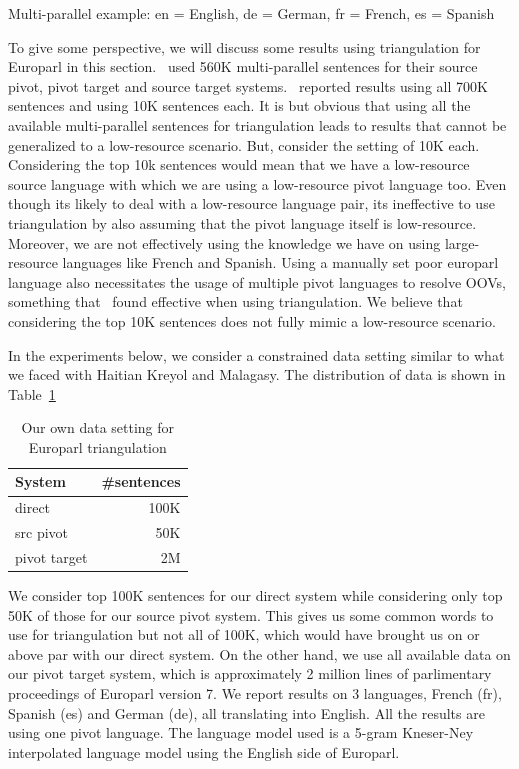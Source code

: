 \begin{table}
	\small
	\centering
	\small
	
	\caption{Multi-parallel example: en = English, de = German, fr = French, es = Spanish}
	\label{table:mparallel}
\end{table}

To give some perspective, we will discuss some results using triangulation for Europarl in this section.~\cite{Utiyama:07} used 560K multi-parallel sentences for their source pivot, pivot target and source target systems.~\cite{Cohn:07} reported results using all 700K sentences and using 10K sentences each. It is but obvious that using all the available multi-parallel sentences for triangulation leads to results that cannot be generalized to a low-resource scenario. But, consider the setting of 10K each. Considering the top 10k sentences would mean that we have a low-resource source language with which we are using a low-resource pivot language too. Even though its likely to deal with a low-resource language pair, its ineffective to use triangulation by also assuming that the pivot language itself is low-resource. Moreover, we are not effectively using the knowledge we have on using large-resource languages like French and Spanish. Using a manually set poor europarl language also necessitates the usage of multiple pivot languages to resolve OOVs, something that~\cite{Cohn:07} found effective when using triangulation. We believe that considering the top 10K sentences does not fully mimic a low-resource scenario. 

In the experiments below, we consider a constrained data setting similar to what we faced with Haitian Kreyol and Malagasy. The distribution of data is shown in Table~\ref{table:eparlsetting}

\begin{table}
	\small
	\centering
	\begin{tabular}{lr}
		\toprule
		System & \#sentences \\
		\toprule
		direct & 100K \\
		src pivot & 50K \\
		pivot target & 2M \\
		\bottomrule
	\end{tabular}
	\caption{Our own data setting for Europarl triangulation}
	\label{table:eparlsetting}
\end{table}

We consider top 100K sentences for our direct system while considering only top 50K of those for our source pivot system. This gives us some common words to use for triangulation but not all of 100K, which would have brought us on or above par with our direct system. On the other hand, we use all available data on our pivot target system, which is approximately 2 million lines of parlimentary proceedings of Europarl version 7. We report results on 3 languages, French (fr), Spanish (es) and German (de), all translating into English. All the results are using one pivot language. The language model used is a 5-gram Kneser-Ney interpolated language model using the English side of Europarl. 




